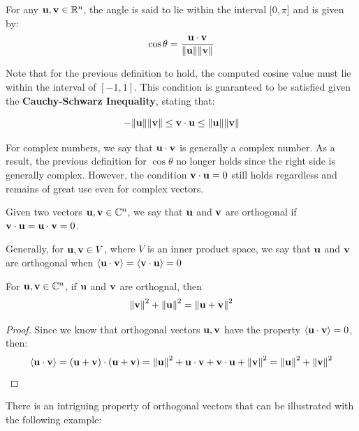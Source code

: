 \documentclass[12pt]{article}
\begin{document}
\begin{definition}
    For any $\mathbf{u}, \mathbf{v} \in \mathbb{R}^n$, the angle is said to lie within the interval [$0, \pi$] and is given by:
    $$\cos \theta = \frac{\mathbf{u} \cdot \mathbf{v}}{\norm{\mathbf{u}} \norm{\mathbf{v}}}$$
\end{definition}

Note that for the previous definition to hold, the computed cosine value must lie within the interval of $[-1, 1]$. This condition is guaranteed to be satisfied given the \textbf{Cauchy-Schwarz Inequality}, stating that:

$$ - \norm{\mathbf{u}} \norm{\mathbf{v}} \leq \mathbf{v} \cdot \mathbf{u} \leq \norm{\mathbf{u}} \norm{\mathbf{v}} $$


For complex numbers, we say that $\mathbf{u} \cdot \mathbf{v}$ is generally a complex number. As a result, the previous definition for $\cos \theta$ no longer holds since the right side is generally complex. However, the condition $\mathbf{v} \cdot \mathbf{u} = 0$ still holds regardless and remains of great use even for complex vectors. 

\begin{definition}[Orthogonality in $\Cn$]
    Given two vectors $\mathbf{u}, \mathbf{v} \in \mathbb{C}^n$, we say that $\mathbf{u}$ and $\mathbf{v}$ are orthogonal if $\mathbf{v} \cdot \mathbf{u} = \mathbf{u} \cdot \mathbf{v} = 0$.
\end{definition}

\begin{definition}
    Generally, for $\mathbf{u}, \mathbf{v} \in V$, where $V$ is an inner product space, we say that $\mathbf{u}$ and $\mathbf{v}$ are orthogonal when $\left\langle\mathbf{u} \cdot \mathbf{v} \right\rangle = \left\langle\mathbf{v} \cdot \mathbf{u} \right\rangle = 0$
\end{definition}

\begin{definition}
    For $\mathbf{u}, \mathbf{v} \in \mathbb{C}^n$, if $\mathbf{u}$ and $\mathbf{v}$ are orthognal, then 
    $$\norm{\mathbf{v}}^2 + \norm{\mathbf{u}}^2 = \norm{\mathbf{u} + \mathbf{v}}^2$$
\end{definition}

\begin{proof}
    Since we know that orthogonal vectors $\mathbf{u}, \mathbf{v}$ have the property $\left\langle\mathbf{u} \cdot \mathbf{v} \right\rangle = 0$, then:
    $$\left\langle\mathbf{u} \cdot \mathbf{v} \right\rangle = (\mathbf{u} + \mathbf{v}) \cdot (\mathbf{u} + \mathbf{v}) = \norm{\mathbf{u}}^2 + \mathbf{u} \cdot \mathbf{v} + \mathbf{v} \cdot \mathbf{u} + \norm{\mathbf{v}}^2 =  \norm{\mathbf{u}}^2 + \norm{\mathbf{v}}^2$$
\end{proof}

There is an intriguing property of orthogonal vectors that can be illustrated with the following example:
\end{document}

